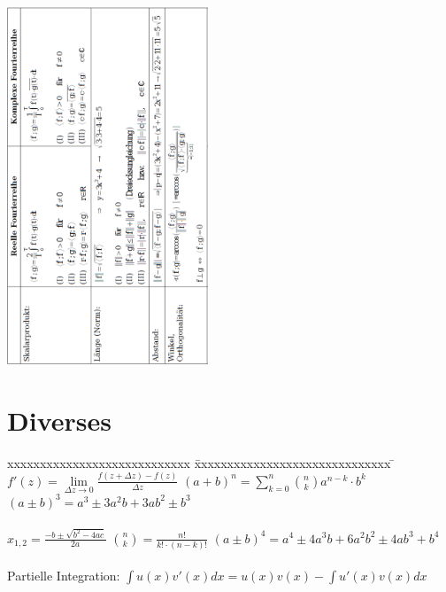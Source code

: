 \begin{minipage}{6cm}
  \includegraphics[width=6cm]{./bilder/vektor1.png}
\end{minipage}

\section{Diverses}
\begin{tabbing}
  xxxxxxxxxxxxxxxxxxxxxxxxxxxx \= xxxxxxxxxxxxxxxxxxxxxxxxxxxxxx \= \kill
  $f'(z) = \lim \limits_{\Delta z \rightarrow 0} \frac{f(z + \Delta z) -
  f(z)}{\Delta z}$ \> $(a + b)^n = \sum_{k=0}^{n} \binom n k a^{n-k} \cdot b^k$ \>
  $(a \pm b)^3 =a^3 \pm  3 a^{2} b + 3 a b^2 \pm b^3 $\\ \\
  $x_{1,2} = \frac{-b \pm \sqrt{b^2 - 4ac}}{2a}$ \> $\binom n k = \frac{n!}{k!
  \cdot (n-k)!}$ \> $(a \pm b)^4 =a^4 \pm  4 a^{3} b + 6a^2b^2 \pm 4 a b^3 +
  b^4$\\ 
  \\Partielle Integration: $\int u(x) v'(x) dx = u(x)v(x) - \int u'(x) v(x) dx$
\end{tabbing}
